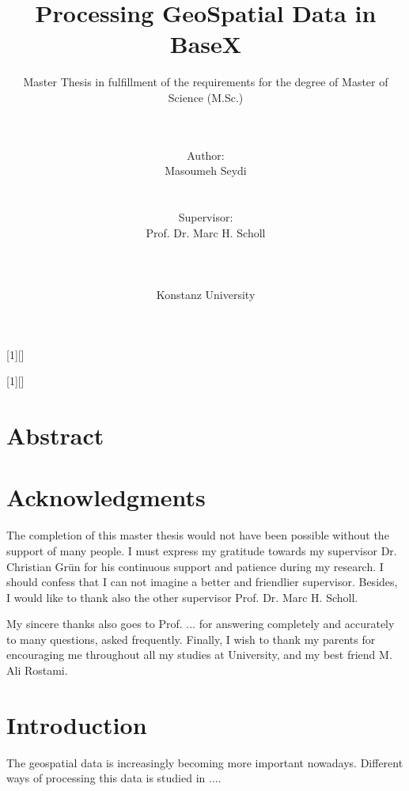 \documentclass[a4paper,12pt]{article}
\title{Processing GeoSpatial Data in BaseX}
\subtitle{Master Thesis in fulfillment of the requirements for the degree of
Master of Science (M.Sc.)}
\author{\\\\Author: \\
	Masoumeh Seydi
	\\\\\\Supervisor: \\
	Prof. Dr. Marc H. Scholl \\ 
	\\\\\\
	Konstanz University}
\begin{document}
[1][]{
\lstset{#1}}{}

[1][]{
\lstset{#1}}{}


\renewcommand{\lstlistingname}{Code}


\maketitle
\thispagestyle{empty}

\newpage
\section*{Abstract}

\thispagestyle{empty}

\newpage
\section*{Acknowledgments}
\thispagestyle{empty}

The completion of this master thesis would not have been possible 
without the support of many people. 
I must express my gratitude towards my supervisor 
Dr. Christian Gr{\"u}n for his continuous support and patience during my research.
I should confess that I can not imagine a better and friendlier
supervisor. Besides, I would like to thank also the other supervisor
Prof. Dr. Marc H. Scholl.

My sincere thanks also goes to Prof. ...  for
answering completely and accurately to many questions, asked
frequently. Finally, I wish to thank my parents for encouraging me 
throughout all my studies at University, and my best friend M. Ali Rostami.


\newpage
\tableofcontents

\thispagestyle{empty}
\newpage
\section{Introduction}
\setcounter{page}{1}
The geospatial data is increasingly becoming more important nowadays.
Different ways of processing this data is studied in ....
\end{document}
